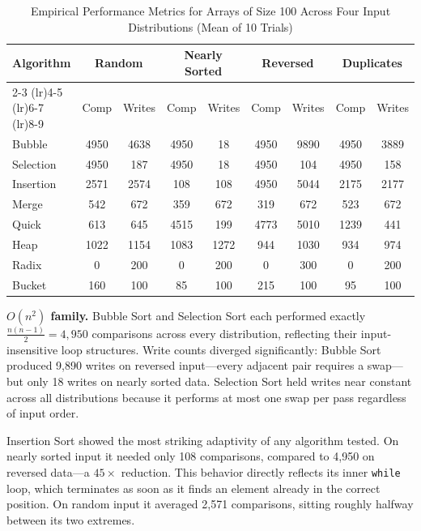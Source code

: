 \documentclass[conference]{IEEEtran}
\begin{document}
\begin{table}[!t]
\caption{Empirical Performance Metrics for Arrays of Size 100 Across Four
Input Distributions (Mean of 10 Trials)}
\label{tab:results}
\centering
\small
\begin{tabular}{lcccccccc}
\toprule
\multirow{2}{*}{Algorithm}
  & \multicolumn{2}{c}{Random}
  & \multicolumn{2}{c}{Nearly Sorted}
  & \multicolumn{2}{c}{Reversed}
  & \multicolumn{2}{c}{Duplicates} \\
\cmidrule(lr){2-3} \cmidrule(lr){4-5}
\cmidrule(lr){6-7} \cmidrule(lr){8-9}
& Comp & Writes & Comp & Writes & Comp & Writes & Comp & Writes \\
\midrule
Bubble     & 4950 & 4638 & 4950 &   18 & 4950 & 9890 & 4950 & 3889 \\
Selection  & 4950 &  187 & 4950 &   18 & 4950 &  104 & 4950 &  158 \\
Insertion  & 2571 & 2574 &  108 &  108 & 4950 & 5044 & 2175 & 2177 \\
Merge      &  542 &  672 &  359 &  672 &  319 &  672 &  523 &  672 \\
Quick      &  613 &  645 & 4515 &  199 & 4773 & 5010 & 1239 &  441 \\
Heap       & 1022 & 1154 & 1083 & 1272 &  944 & 1030 &  934 &  974 \\
Radix      &    0 &  200 &    0 &  200 &    0 &  300 &    0 &  200 \\
Bucket     &  160 &  100 &   85 &  100 &  215 &  100 &   95 &  100 \\
\bottomrule
\end{tabular}
\end{table}

\textbf{$O(n^2)$ family.} Bubble Sort and Selection Sort each performed exactly
$\frac{n(n-1)}{2} = 4{,}950$ comparisons across every distribution, reflecting
their input-insensitive loop structures. Write counts diverged significantly:
Bubble Sort produced 9,890 writes on reversed input---every adjacent pair
requires a swap---but only 18 writes on nearly sorted data. Selection Sort held
writes near constant across all distributions because it performs at most one
swap per pass regardless of input order.

Insertion Sort showed the most striking adaptivity of any algorithm tested. On
nearly sorted input it needed only 108 comparisons, compared to 4,950 on
reversed data---a $45\times$ reduction. This behavior directly reflects its
inner \texttt{while} loop, which terminates as soon as it finds an element
already in the correct position. On random input it averaged 2,571 comparisons,
sitting roughly halfway between its two extremes.
\end{document}

